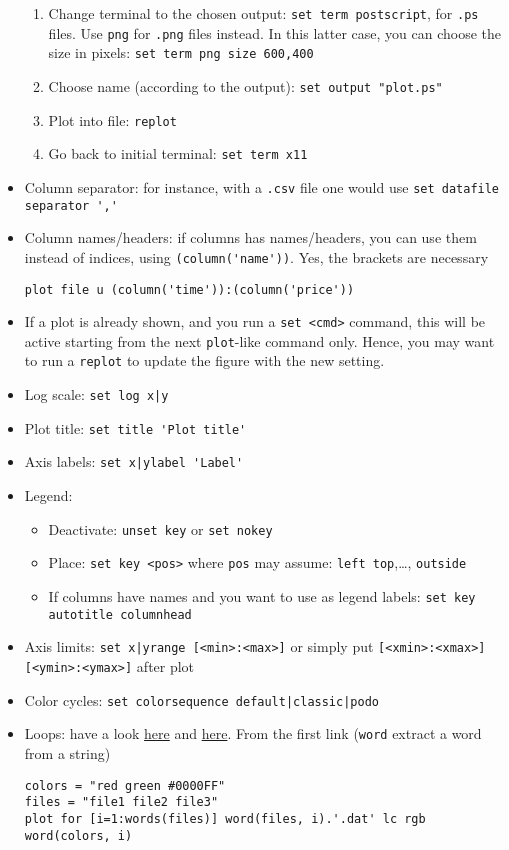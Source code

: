 \documentclass[a4paper,12pt,%
              final%
              ]{article}
\begin{document}
\begin{itemize}
\begin{enumerate}
      \item Change terminal to the chosen output: \verb|set term postscript|, for \texttt{.ps} files. Use \texttt{png} for \texttt{.png} files instead. In this latter case, you can choose the size in pixels: \verb|set term png size 600,400|
      \item Choose name (according to the output): \verb|set output "plot.ps"|
      \item Plot into file: \verb|replot|
      \item Go back to initial terminal: \verb|set term x11|
    \end{enumerate}
  \item Column separator: for instance, with a \texttt{.csv} file one would use \verb|set datafile separator ','|
  \item Column names/headers: if columns has names/headers, you can use them instead of indices, using \verb|(column('name'))|. Yes, the brackets are necessary
\begin{verbatim}
plot file u (column('time')):(column('price'))
\end{verbatim}
  \item If a plot is already shown, and you run a \verb|set <cmd>| command, this will be active starting from the next \verb|plot|-like command only. Hence, you may want to run a \verb|replot| to update the figure with the new setting.
  \item Log scale: \verb!set log x|y!
  \item Plot title: \verb|set title 'Plot title'|
  \item Axis labels: \verb!set x|ylabel 'Label'!
  \item Legend:
    \begin{itemize}
      \item Deactivate: \verb|unset key| or \verb|set nokey|
      \item Place: \verb|set key <pos>| where \verb|pos| may assume: \verb|left top|,\ldots, \verb|outside|
      \item If columns have names and you want to use as legend labels: \texttt{set key autotitle columnhead}
    \end{itemize}
  \item Axis limits: \verb!set x|yrange [<min>:<max>]! or simply put \verb![<xmin>:<xmax>] [<ymin>:<ymax>]! after plot
  \item Color cycles: \verb!set colorsequence default|classic|podo!
  \item Loops: have a look \href{https://stackoverflow.com/a/18592561}{here} and \href{https://stackoverflow.com/a/14947085}{here}. From the first link (\verb|word| extract a word from a string)
\begin{verbatim}
colors = "red green #0000FF"
files = "file1 file2 file3"
plot for [i=1:words(files)] word(files, i).'.dat' lc rgb word(colors, i)
\end{verbatim}
\end{itemize}
\end{document}
